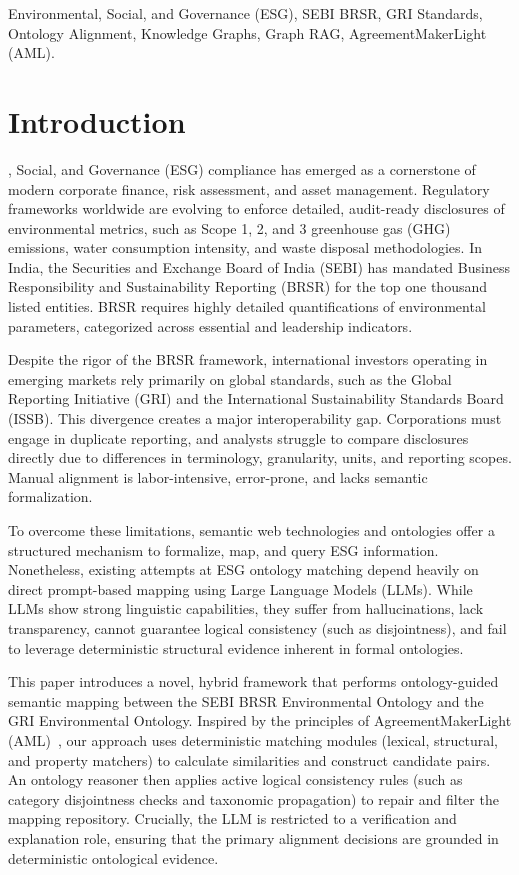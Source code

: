\documentclass[journal,compsoc]{IEEEtran}
\begin{document}
\begin{IEEEkeywords}
Environmental, Social, and Governance (ESG), SEBI BRSR, GRI Standards, Ontology Alignment, Knowledge Graphs, Graph RAG, AgreementMakerLight (AML).
\end{IEEEkeywords}

\section{Introduction}
, Social, and Governance (ESG) compliance has emerged as a cornerstone of modern corporate finance, risk assessment, and asset management. Regulatory frameworks worldwide are evolving to enforce detailed, audit-ready disclosures of environmental metrics, such as Scope 1, 2, and 3 greenhouse gas (GHG) emissions, water consumption intensity, and waste disposal methodologies. In India, the Securities and Exchange Board of India (SEBI) has mandated Business Responsibility and Sustainability Reporting (BRSR) for the top one thousand listed entities. BRSR requires highly detailed quantifications of environmental parameters, categorized across essential and leadership indicators.

Despite the rigor of the BRSR framework, international investors operating in emerging markets rely primarily on global standards, such as the Global Reporting Initiative (GRI) and the International Sustainability Standards Board (ISSB). This divergence creates a major interoperability gap. Corporations must engage in duplicate reporting, and analysts struggle to compare disclosures directly due to differences in terminology, granularity, units, and reporting scopes. Manual alignment is labor-intensive, error-prone, and lacks semantic formalization. 

To overcome these limitations, semantic web technologies and ontologies offer a structured mechanism to formalize, map, and query ESG information. Nonetheless, existing attempts at ESG ontology matching depend heavily on direct prompt-based mapping using Large Language Models (LLMs). While LLMs show strong linguistic capabilities, they suffer from hallucinations, lack transparency, cannot guarantee logical consistency (such as disjointness), and fail to leverage deterministic structural evidence inherent in formal ontologies.

This paper introduces a novel, hybrid framework that performs ontology-guided semantic mapping between the SEBI BRSR Environmental Ontology and the GRI Environmental Ontology. Inspired by the principles of AgreementMakerLight (AML)~\cite{aml2013}, our approach uses deterministic matching modules (lexical, structural, and property matchers) to calculate similarities and construct candidate pairs. An ontology reasoner then applies active logical consistency rules (such as category disjointness checks and taxonomic propagation) to repair and filter the mapping repository. Crucially, the LLM is restricted to a verification and explanation role, ensuring that the primary alignment decisions are grounded in deterministic ontological evidence.
\end{document}
